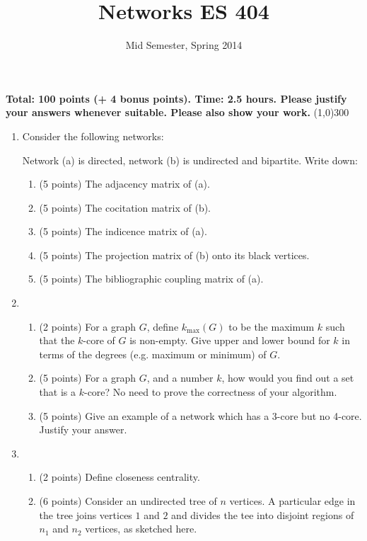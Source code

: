 \documentclass[a4paper,10pt]{article}
\title{Networks ES 404}
\author{Mid Semester, Spring 2014}
\begin{document}
\maketitle
\begin{center}
 \textbf{Total: 100 points (+ 4 bonus points). Time: 2.5 hours. Please justify your answers whenever suitable. Please also show your work.} 
 \line(1,0){300}
\end{center}


\begin{enumerate}
 \item Consider the following networks:
 \vspace*{2in}
 
 
 Network (a) is directed, network (b) is undirected and bipartite. Write down:
 \begin{enumerate}
 \item (5 points) The adjacency matrix of (a).
 \item (5 points) The cocitation matrix of (b).
 \item (5 points) The indicence matrix of (a).
 \item (5 points) The projection matrix of (b) onto its black vertices. 
 \item (5 points) The bibliographic coupling matrix of (a). 
\end{enumerate}


\item 
\begin{enumerate}
\item (2 points) For a graph $G$, define $k_{\max}(G)$ to be the maximum $k$ such that the $k$-core of $G$ is non-empty.
Give upper and lower bound for $k$ in terms of the degrees (e.g. maximum or minimum) of $G$. 
\item (5 points) For a graph $G$, and a number $k$, how would you find out a set that is a $k$-core? No need to prove
the correctness of your algorithm.
\item (5 points) Give an example of a network which has a 3-core but no 4-core. Justify your answer.
\end{enumerate}


\item 
\begin{enumerate}
\item (2 points) Define closeness centrality.
\item (6 points) Consider an undirected tree of $n$ vertices. A particular edge in the tree joins vertices $1$ and $2$
and divides the tee into disjoint regions of $n_1$ and $n_2$ vertices, as sketched here. 
\vspace*{2in}


\end{enumerate}
\end{enumerate}
\end{document}
